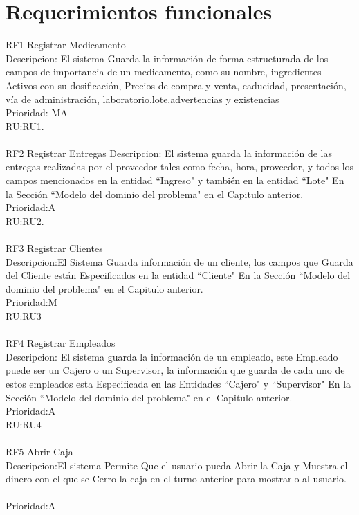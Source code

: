 \section{Requerimientos funcionales}
RF1 Registrar Medicamento\\
Descripcion: El sistema Guarda la información de forma estructurada de los campos de importancia de un medicamento, como su nombre, ingredientes Activos con su dosificación, Precios de compra y venta, caducidad, presentación, vía de administración, laboratorio,lote,advertencias y existencias\\
Prioridad: MA\\
RU:RU1.\\
\\
RF2 Registrar Entregas 
Descripcion: El sistema guarda la información de las entregas realizadas por el proveedor tales como fecha, hora, proveedor, y todos los campos mencionados en la entidad ``Ingreso" y también en la entidad ``Lote" En la Sección ``Modelo del dominio del problema" en el  Capitulo anterior.\\
Prioridad:A\\
RU:RU2.\\
\\
RF3 Registrar Clientes\\
Descripcion:El Sistema Guarda información de un cliente, los campos que Guarda del Cliente están Especificados en la entidad ``Cliente" En la Sección ``Modelo del dominio del problema" en el  Capitulo anterior.\\
Prioridad:M\\
RU:RU3\\
\\
RF4 Registrar Empleados\\
Descripcion: El sistema guarda la información de un empleado, este Empleado puede ser un Cajero o un Supervisor, la información que guarda de cada uno de estos empleados esta Especificada en las Entidades ``Cajero" y ``Supervisor" En la Sección ``Modelo del dominio del problema" en el  Capitulo anterior.\\
Prioridad:A\\
RU:RU4\\
\\
RF5 Abrir Caja\\
Descripcion:El sistema Permite Que el usuario pueda Abrir la Caja y Muestra el dinero con el que se Cerro la caja en el turno anterior para mostrarlo al usuario.\\
\\
Prioridad:A\\
